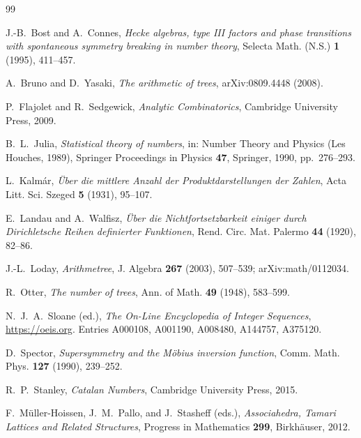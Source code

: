 \documentclass[11pt]{article}
\numberwithin{equation}{section}
\theoremstyle{plain}
\theoremstyle{definition}
\theoremstyle{remark}
\begin{document}
\begin{thebibliography}{99}

J.-B.~Bost and A.~Connes,
\emph{Hecke algebras, type III factors and phase transitions with spontaneous symmetry
breaking in number theory},
Selecta Math. (N.S.) \textbf{1} (1995), 411--457.

A.~Bruno and D.~Yasaki,
\emph{The arithmetic of trees},
arXiv:0809.4448 (2008).

P.~Flajolet and R.~Sedgewick,
\emph{Analytic Combinatorics},
Cambridge University Press, 2009.

B.~L.~Julia,
\emph{Statistical theory of numbers},
in: Number Theory and Physics (Les Houches, 1989), Springer Proceedings in Physics
\textbf{47}, Springer, 1990, pp.~276--293.

L.~Kalm\'ar,
\emph{\"Uber die mittlere Anzahl der Produktdarstellungen der Zahlen},
Acta Litt. Sci. Szeged \textbf{5} (1931), 95--107.

E.~Landau and A.~Walfisz,
\emph{\"Uber die Nichtfortsetzbarkeit einiger durch Dirichletsche Reihen definierter
Funktionen},
Rend. Circ. Mat. Palermo \textbf{44} (1920), 82--86.

J.-L.~Loday,
\emph{Arithmetree},
J. Algebra \textbf{267} (2003), 507--539; arXiv:math/0112034.

R.~Otter,
\emph{The number of trees},
Ann. of Math. \textbf{49} (1948), 583--599.

N.~J.~A.~Sloane (ed.),
\emph{The On-Line Encyclopedia of Integer Sequences},
\url{https://oeis.org}. Entries A000108, A001190, A008480, A144757, A375120.

D.~Spector,
\emph{Supersymmetry and the M\"obius inversion function},
Comm. Math. Phys. \textbf{127} (1990), 239--252.

R.~P.~Stanley,
\emph{Catalan Numbers},
Cambridge University Press, 2015.

F.~M\"uller-Hoissen, J.~M.~Pallo, and J.~Stasheff (eds.),
\emph{Associahedra, Tamari Lattices and Related Structures},
Progress in Mathematics \textbf{299}, Birkh\"auser, 2012.

\end{thebibliography}
\end{document}
